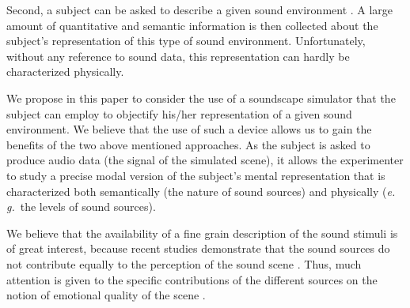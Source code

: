 \documentclass[12pt]{elsarticle}
\newcommand{\ie}{\emph{i.\,e.}}
\newcommand{\eg}{\emph{e.\,g.}}
\begin{document}
Second, a subject can be asked to describe a given sound environment \cite{guastavino2006ideal, dubois2006cognitive}. A large amount of quantitative and semantic information is then collected about the subject's representation of this type of sound environment. Unfortunately, without any reference to sound data, this representation can hardly be characterized physically.


We propose in this paper to consider the use of a soundscape simulator that the subject can employ to objectify his/her representation of a given sound environment. We believe that the use of such a device allows us to gain the benefits of the two above mentioned approaches. As the subject is asked to produce audio data (the signal of the simulated scene), it allows the experimenter to study a precise modal version of the subject's mental representation that is characterized both semantically (the nature of sound sources) and physically (\eg~the levels of sound sources).


We believe that the availability of a fine grain description of the sound stimuli is of great interest, because recent studies demonstrate that the sound sources do not contribute equally to the perception of the sound scene \cite{defreville2004aactivity,lavandier2006contribution,guastavino2006ideal,nilsson2007soundscape,szeremeta2009analysis}. Thus, much attention is given to the specific contributions of the different sources on the notion of emotional quality of the scene \cite{gozalo2015relationship,ricciardi2015sound}.
\end{document}
